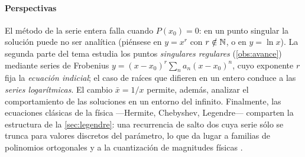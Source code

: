 


\paragraph{Perspectivas}
El método de la serie entera falla cuando $P(x_0)=0$: en un punto singular
la solución puede no ser analítica (piénsese en $y=x^{r}$ con $r\notin\mathbb{N}$,
o en $y=\ln x$). La segunda parte del tema \cite[cap.~V]{TEMAV} estudia los
puntos \emph{singulares regulares} (\cref{obs:avance}) mediante series de
Frobenius $y=(x-x_0)^{r}\sum_n a_n(x-x_0)^n$, cuyo exponente $r$ fija la
\emph{ecuación indicial}; el caso de raíces que difieren en un entero
conduce a las \emph{series logarítmicas}. El cambio $\bar x=1/x$ permite,
además, analizar el comportamiento de las soluciones en un entorno del
infinito. Finalmente, las ecuaciones clásicas de la física ---Hermite,
Chebyshev, Legendre--- comparten la estructura de la \cref{sec:legendre}:
una recurrencia de salto dos cuya serie sólo se trunca para valores
discretos del parámetro, lo que da lugar a familias de polinomios
ortogonales y a la cuantización de magnitudes físicas
\cite{ARFKEN,RILEY}.
